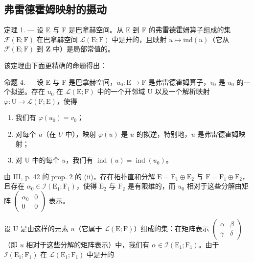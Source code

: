\subsection{弗雷德霍姆映射的摄动}

定理 1. --- 设 E 与 F 是巴拿赫空间。从 E 到 F 的弗雷德霍姆算子组成的集 \(\mathcal{F}(\mathrm{E};\mathrm{F})\) 在巴拿赫空间 \(\mathcal{L}(\mathrm{E};\mathrm{F})\) 中是开的，且映射 \(u\mapsto\mathrm{ind}(u)\)（它从 \(\mathcal{F}(\mathrm{E};\mathrm{F})\) 到 \(\mathbf{Z}\) 中）是局部常值的。

该定理由下面更精确的命题得出：

命题 4. --- 设 E 与 F 是巴拿赫空间，\(u_{0}\colon\mathrm{E}\to\mathrm{F}\) 是弗雷德霍姆算子，\(v_{0}\) 是 \(u_{0}\) 的一个拟逆。存在 \(u_{0}\) 在 \(\mathcal{L}(\mathrm{E};\mathrm{F})\) 中的一个开邻域 U 以及一个解析映射 \(\varphi\colon\mathrm{U}\to\mathcal{L}(\mathrm{F};\mathrm{E})\)，使得

\begin{enumerate}
\def\labelenumi{(\roman{enumi})}
\item
  我们有 \(\varphi(u_{0}) = v_{0}\)；
\item
  对每个 \(u\)（在 \(U\) 中），映射 \(\varphi(u)\) 是 \(u\) 的拟逆，特别地，\(u\) 是弗雷德霍姆映射；
\item
  对 U 中的每个 \(u\)，我们有 \(\operatorname{ind}(u) = \operatorname{ind}(u_0)\)。
\end{enumerate}

由 III, p. 42 的 prop. 2 的 (ii)，存在拓扑直和分解 \(\mathrm{E} = \mathrm{E}_1 \oplus \mathrm{E}_2\) 与 \(\mathrm{F} = \mathrm{F}_1 \oplus \mathrm{F}_2\)，且存在 \(\alpha_0 \in \mathcal{I}(\mathrm{E}_1; \mathrm{F}_1)\)，使得 \(\mathrm{E}_2\) 与 \(\mathrm{F}_2\) 是有限维的，而 \(u_0\) 相对于这些分解由矩阵 \(\left( \begin{array}{cc}\alpha_0 & 0\\ 0 & 0 \end{array} \right)\) 表示。

设 U 是由这样的元素 \(u\)（它属于 \(\mathcal{L}(\mathrm{E};\mathrm{F})\)）组成的集：在矩阵表示 \(\left( \begin{array}{cc}\alpha & \beta \\ \gamma & \delta \end{array} \right)\)（即 \(u\) 相对于这些分解的矩阵表示）中，我们有 \(\alpha \in \mathcal{I}(\mathrm{E}_1;\mathrm{F}_1)\)。由于 \(\mathcal{I}(\mathrm{E}_1;\mathrm{F}_1)\) 在 \(\mathcal{L}(\mathrm{E}_1;\mathrm{F}_1)\) 中是开的

